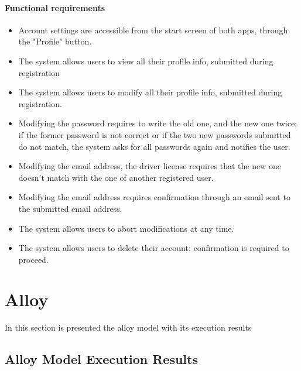 \paragraph{Functional requirements }
\begin{itemize}
	\item Account settings are accessible from the start screen of both apps, through the "Profile" button.
	\item The system allows users to view all their profile info, submitted during registration
	\item The system allows users to modify all their profile info, submitted during registration.
	\item Modifying the password requires to write the old one, and the new one twice; if the former password is not correct or if the two new passwords submitted do not match, the system asks for all passwords again and notifies the user.
	\item Modifying the email address, the driver license requires that the new one doesn't match with the one of another registered user.
	\item Modifying the email address requires confirmation through an email sent to the submitted email address.
	\item The system allows users to abort modifications at any time.
	\item The system allows users to delete their account: confirmation is required to proceed.
\end{itemize}

\section{Alloy}
In this section is presented the alloy model with its execution results

\subsection{Alloy Model Execution Results}
